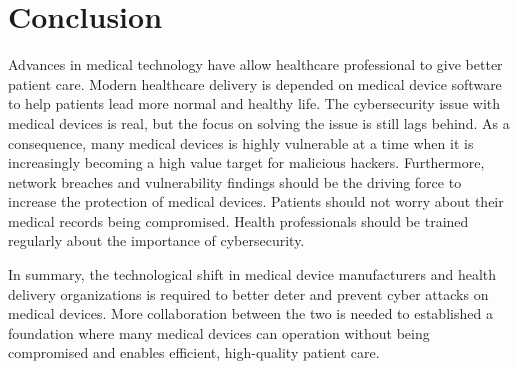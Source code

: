 \documentclass[pdf,bookmarks,colorlinks=true]{IEEEtran}
\begin{document}
\section{Conclusion}
\label{sec:Conclusion}
Advances in medical technology have allow healthcare professional to give better patient care. Modern healthcare delivery is depended on medical device software to help patients lead more normal and healthy life. The cybersecurity issue with medical devices is real, but the focus on solving the issue is still lags behind. As a consequence, many medical devices is highly vulnerable at a time when it is increasingly becoming a high value target for malicious hackers. Furthermore, network breaches and vulnerability findings should be the driving force to increase the protection of medical devices. Patients should not worry about their medical records being compromised. Health professionals should be trained regularly about the importance of cybersecurity. \par 
In summary, the technological shift in medical device manufacturers and health delivery organizations is required to better deter and prevent cyber attacks on medical devices. More collaboration between the two is needed to established a foundation where many medical devices can operation without being compromised and enables efficient, high-quality patient care.





\end{document}
